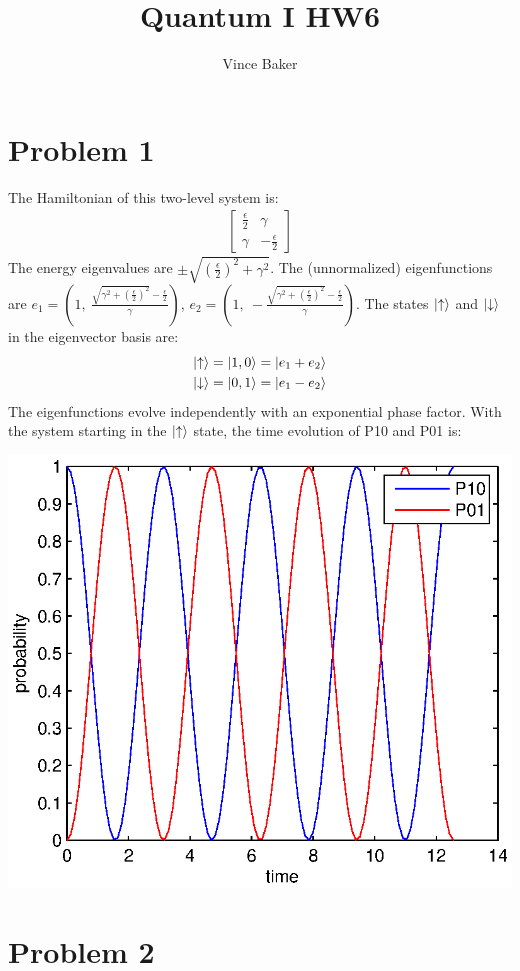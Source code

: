 \documentclass[a4paper,12pt]{article}
\title{Quantum I HW6}
\author{Vince Baker}
\numberwithin{equation}{section}
\begin{document}
\maketitle

\section{Problem 1}
The Hamiltonian of this two-level system is:
\begin{gather}
 \begin{bmatrix}
  \frac{\epsilon}{2} & \gamma\\
  \gamma    & -\frac{\epsilon}{2}
 \end{bmatrix}
\end{gather}
The energy eigenvalues are $\pm\sqrt{(\frac{\epsilon}{2})^2+\gamma^2}$.
The (unnormalized) eigenfunctions are 
$e_1=\left (1,\ \frac{\sqrt{\gamma^2+(\frac{\epsilon}{2})^2}-\frac{\epsilon}{2}}{\gamma} \right)$, 
$e_2=\left (1,\ -\frac{\sqrt{\gamma^2+(\frac{\epsilon}{2})^2}-\frac{\epsilon}{2}}{\gamma} \right)$.
The states $\ket{\uparrow}$ and $\ket{\downarrow}$ in the eigenvector basis are:
\begin{gather}
 \ket{\uparrow}=\ket{1,0}=\ket{e_1+e_2}\\
 \ket{\downarrow}=\ket{0,1}=\ket{e_1-e_2}
\end{gather}
The eigenfunctions evolve independently with an exponential phase factor. With the system starting in the $\ket{\uparrow}$ state, the time evolution of P10 and P01 is:

\includegraphics{p1}
\\
\section{Problem 2}
\end{document}
